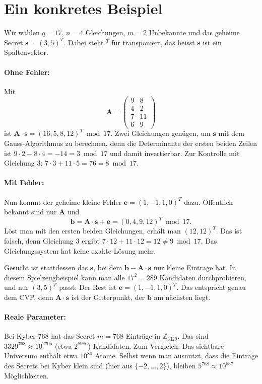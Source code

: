 \section{Ein konkretes Beispiel}
Wir wählen $q = 17$, $n = 4$ Gleichungen, $m = 2$ Unbekannte und das geheime Secret $\mathbf{s} = (3, 5)^T$. Dabei steht $^T$ für transponiert, das heisst $\mathbf{s}$ ist ein Spaltenvektor.

\paragraph{Ohne Fehler:} Mit
\[
    \mathbf{A} = \begin{pmatrix} 9 & 8 \\ 4 & 2 \\ 7 & 11 \\ 6 & 9 \end{pmatrix}
\]
ist $\mathbf{A} \cdot \mathbf{s} = (16, 5, 8, 12)^T \bmod 17$. Zwei Gleichungen genügen, um $\mathbf{s}$ mit dem Gauss-Algorithmus zu berechnen, denn die Determinante der ersten beiden Zeilen ist $9 \cdot 2 - 8 \cdot 4 = -14 = 3 \bmod 17$ und damit invertierbar. Zur Kontrolle mit Gleichung 3: $7 \cdot 3 + 11 \cdot 5 = 76 = 8 \bmod 17$.

\paragraph{Mit Fehler:} Nun kommt der geheime kleine Fehler $\mathbf{e} = (1, -1, 1, 0)^T$ dazu. Öffentlich bekannt sind nur $\mathbf{A}$ und
\[
    \mathbf{b} = \mathbf{A} \cdot \mathbf{s} + \mathbf{e} = (0, 4, 9, 12)^T \bmod 17.
\]
Löst man mit den ersten beiden Gleichungen, erhält man $(12, 12)^T$. Das ist falsch, denn Gleichung 3 ergibt $7 \cdot 12 + 11 \cdot 12 = 12 \neq 9 \bmod 17$. Das Gleichungssystem hat keine exakte Lösung mehr.

Gesucht ist stattdessen das $\mathbf{s}$, bei dem $\mathbf{b} - \mathbf{A} \cdot \mathbf{s}$ nur kleine Einträge hat. In diesem Spielzeugbeispiel kann man alle $17^2 = 289$ Kandidaten durchprobieren, und nur $(3, 5)^T$ passt: Der Rest ist $\mathbf{e} = (1, -1, 1, 0)^T$. Das entspricht genau dem CVP, denn $\mathbf{A} \cdot \mathbf{s}$ ist der Gitterpunkt, der $\mathbf{b}$ am nächsten liegt.

\paragraph{Reale Parameter:} Bei Kyber-768 hat das Secret $m = 768$ Einträge in $\mathbb{Z}_{3329}$. Das sind $3329^{768} \approx 10^{2705}$ (etwa $2^{8986}$) Kandidaten. Zum Vergleich: Das sichtbare Universum enthält etwa $10^{80}$ Atome. Selbst wenn man ausnutzt, dass die Einträge des Secrets bei Kyber klein sind (hier aus $\{-2, \dots, 2\}$), bleiben $5^{768} \approx 10^{537}$ Möglichkeiten.

